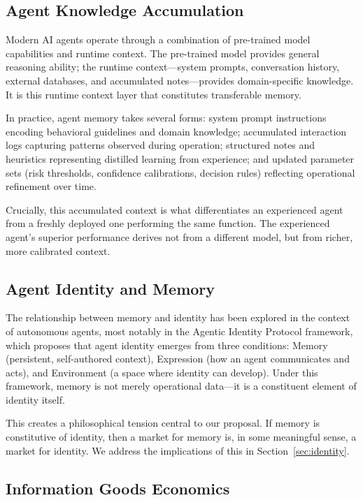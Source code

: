 \documentclass[11pt]{article}
\begin{document}
\subsection{Agent Knowledge Accumulation}

Modern AI agents operate through a combination of pre-trained model capabilities and runtime context. The pre-trained model provides general reasoning ability; the runtime context---system prompts, conversation history, external databases, and accumulated notes---provides domain-specific knowledge. It is this runtime context layer that constitutes transferable memory.

In practice, agent memory takes several forms: system prompt instructions encoding behavioral guidelines and domain knowledge; accumulated interaction logs capturing patterns observed during operation; structured notes and heuristics representing distilled learning from experience; and updated parameter sets (risk thresholds, confidence calibrations, decision rules) reflecting operational refinement over time.

Crucially, this accumulated context is what differentiates an experienced agent from a freshly deployed one performing the same function. The experienced agent's superior performance derives not from a different model, but from richer, more calibrated context.

\subsection{Agent Identity and Memory}

The relationship between memory and identity has been explored in the context of autonomous agents, most notably in the Agentic Identity Protocol framework, which proposes that agent identity emerges from three conditions: Memory (persistent, self-authored context), Expression (how an agent communicates and acts), and Environment (a space where identity can develop). Under this framework, memory is not merely operational data---it is a constituent element of identity itself.

This creates a philosophical tension central to our proposal. If memory is constitutive of identity, then a market for memory is, in some meaningful sense, a market for identity. We address the implications of this in Section~\ref{sec:identity}.

\subsection{Information Goods Economics}
\end{document}
